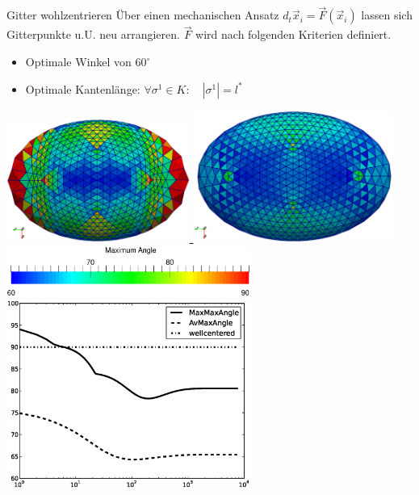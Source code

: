 \documentclass[handout]{beamer}
\begin{document}
  \begin{frame}
    \begin{block}{Gitter wohlzentrieren}
      Über einen mechanischen Ansatz \( d_{t}\vec{x}_{i} = \vec{F}\left( \vec{x}_{i} \right)\) lassen sich Gitterpunkte u.U. neu arrangieren.
      \( \vec{F} \) wird nach folgenden Kriterien definiert.
      \begin{itemize}
        \item<2-> Optimale Winkel von \( 60^{\circ} \)
        \item<3-> Optimale Kantenlänge: \( \forall\sigma^{1}\in K:\quad \left| \sigma^{1} \right| = l^{*} \)
      \end{itemize}
    \end{block}
    \begin{overprint}
       \centering\href{run:videos/meshCorr/runVideo.sh}{\includegraphics[width=0.45\textwidth]{videos/meshCorr/step0.eps}\hfill
                                                                   \includegraphics[width=0.49\textwidth]{videos/meshCorr/step1000.eps}\\
                                                                   \includegraphics[width=0.6\textwidth]{videos/meshCorr/bar.eps}}
       \centering\href{run:videos/meshCorr/runVideo.sh}{\includegraphics[width=0.6\textwidth]{videos/meshCorr/plot.eps}}
    \end{overprint}
  \end{frame}
\end{document}
